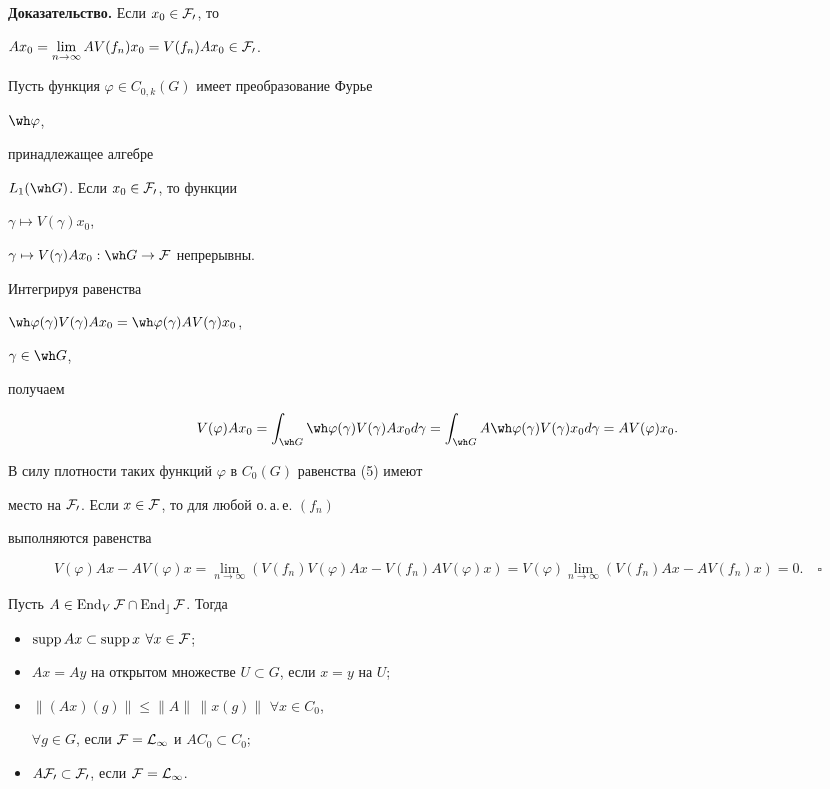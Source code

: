  


{\bf Доказательство.} Если $x_0\in\cal F_0$, то 


$Ax_0=\lim\limits_{n\to\infty}AV(f_n)x_0=V(f_n)Ax_0\in\cal F_0$. 


 


Пусть функция $\varphi\in C_{0,k}(G)$ имеет преобразование Фурье 


$\wh\varphi$, 


принадлежащее алгебре 


$L_1(\wh G)$. Если $x_0\in\cal F_0$, то функции 


$\gamma\mapsto V(\gamma)x_0$, 


$\gamma\mapsto V(\gamma)Ax_0:\wh G\to\cal F$ непрерывны. 


Интегрируя равенства 


$\wh\varphi(\gamma)V(\gamma)Ax_0=\wh\varphi(\gamma)AV(\gamma)x_0$, 


$\gamma\in\wh G$, 


получаем 


$$ 


V(\varphi)Ax_0=\int_{\wh G}\wh\varphi(\gamma)V(\gamma)Ax_0d\gamma= 


\int_{\wh G}A\wh\varphi(\gamma)V(\gamma)x_0d\gamma=AV(\varphi)x_0. 


$$ 


В силу плотности таких функций $\varphi$ в $C_0(G)$ равенства (5) имеют 


место на $\cal F_0$. Если $x\in\cal F$, то для любой о.\,а.\,е. $(f_n)$


выполняются равенства 


$$ 


V(\varphi)Ax-AV(\varphi)x = \lim_{n\to\infty}(V(f_n)V(\varphi)Ax- 


V(f_n)AV(\varphi)x)= 


V(\varphi)\lim_{n\to\infty}(V(f_n)Ax-AV(f_n)x)=0.\quad\square 


$$ 


 


\begin{cor} Пусть $A\in\operatorname{End}_V\cal F\cap\operatorname{End}_c\cal F$. Тогда 


\begin{itemize} 


\item[1)] $\operatorname{supp} Ax\subset\operatorname{supp} x$ $\forall x\in\cal F$; 


\item[2)] $Ax=Ay$ на открытом множестве $U\subset G$, если $x=y$ на $U$; 


\item[3)] $\|(Ax)(g)\|\le\|A\|\,\|x(g)\|$ $\forall x\in C_0$, 


$\forall g\in G$, если $\cal F=L_\infty$ и $AC_0\subset C_0$; 


\item[4)] $A\cal F_0\subset\cal F_0$, если $\cal F=L_\infty$. 


\end{itemize} 


\end{cor} 


